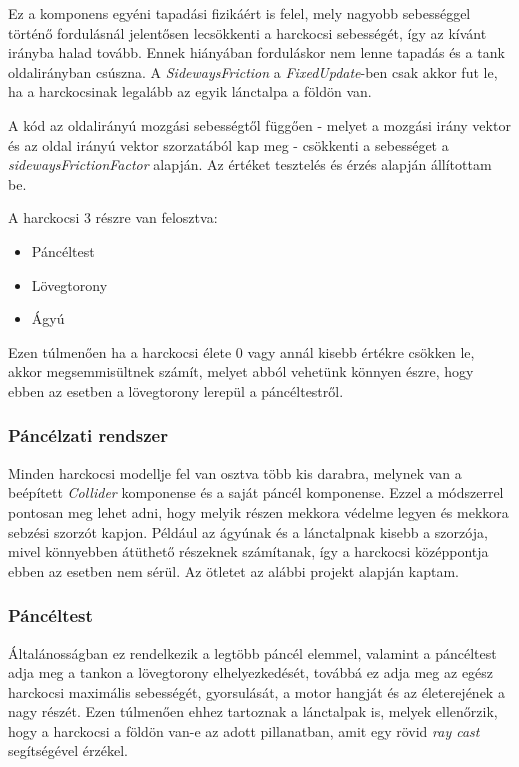 \documentclass[
]{thesis-ekf}
\theoremstyle{definition}
\theoremstyle{remark}
\begin{document}
Ez a komponens egyéni tapadási fizikáért is felel, mely nagyobb sebességgel történő fordulásnál jelentősen lecsökkenti a harckocsi sebességét, így az kívánt irányba halad tovább. Ennek hiányában forduláskor nem lenne tapadás és a tank oldalirányban csúszna. A \emph{SidewaysFriction} a \emph{FixedUpdate}-ben csak akkor fut le, ha a harckocsinak legalább az egyik lánctalpa a földön van.



A kód az oldalirányú mozgási sebességtől függően - melyet a mozgási irány vektor és az oldal irányú vektor szorzatából kap meg - csökkenti a sebességet a \emph{sidewaysFrictionFactor} alapján. Az értéket tesztelés és érzés alapján állítottam be.

A harckocsi 3 részre van felosztva:
\begin{itemize}
    \item Páncéltest
    \item Lövegtorony
    \item Ágyú
\end{itemize}

Ezen túlmenően ha a harckocsi élete 0 vagy annál kisebb értékre csökken le, akkor megsemmisültnek számít, melyet abból vehetünk könnyen észre, hogy ebben az esetben a lövegtorony lerepül a páncéltestről.


\subsubsection{Páncélzati rendszer}
Minden harckocsi modellje fel van osztva több kis darabra, melynek van a beépített \emph{Collider} komponense és a saját páncél komponense. Ezzel a módszerrel pontosan meg lehet adni, hogy melyik részen mekkora védelme legyen és mekkora sebzési szorzót kapjon. Például az ágyúnak és a lánctalpnak kisebb a szorzója, mivel könnyebben átüthető részeknek számítanak, így a harckocsi középpontja ebben az esetben nem sérül. Az ötletet az alábbi projekt\cite{armoridea} alapján kaptam.

\subsubsection{Páncéltest}

Általánosságban ez rendelkezik a legtöbb páncél elemmel, valamint a páncéltest adja meg a tankon a lövegtorony elhelyezkedését, továbbá ez adja meg az egész harckocsi maximális sebességét, gyorsulását, a motor hangját és az életerejének a nagy részét. Ezen túlmenően ehhez tartoznak a lánctalpak is, melyek ellenőrzik, hogy a harckocsi a földön van-e az adott pillanatban, amit  egy rövid \emph{ray cast} segítségével érzékel.
\end{document}
